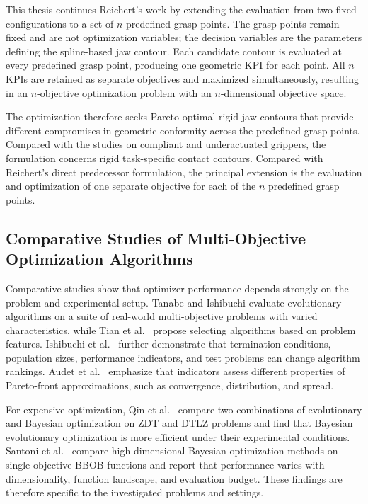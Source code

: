 This thesis continues Reichert's work by extending the evaluation from two fixed configurations to a set of \(n\) predefined grasp points. The grasp
points remain fixed and are not optimization variables; the decision variables are the parameters defining the spline-based jaw contour. Each
candidate contour is evaluated at every predefined grasp point, producing one geometric KPI for each point. All \(n\) KPIs are retained as separate
objectives and maximized simultaneously, resulting in an \(n\)-objective optimization problem with an \(n\)-dimensional objective space.

The optimization therefore seeks Pareto-optimal rigid jaw contours that provide different compromises in geometric conformity across the predefined
grasp points. Compared with the studies on compliant and underactuated grippers, the formulation concerns rigid task-specific contact contours.
Compared with Reichert's direct predecessor formulation, the principal extension is the evaluation and optimization of one separate objective for
each of the \(n\) predefined grasp points.

\subsection{Comparative Studies of Multi-Objective Optimization Algorithms}
\label{subsec:comparative_optimization_studies}

Comparative studies show that optimizer performance depends strongly on the problem and experimental setup. Tanabe and Ishibuchi \cite{Tanabe2020An}
evaluate evolutionary algorithms on a suite of real-world multi-objective problems with varied characteristics, while Tian et al.\
\cite{Tian2019Automated} propose selecting algorithms based on problem features. Ishibuchi et al.\ \cite{Ishibuchi2022Difficulties} further
demonstrate that termination conditions, population sizes, performance indicators, and test problems can change algorithm rankings. Audet et al.\
\cite{Audet2018Performance} emphasize that indicators assess different properties of Pareto-front approximations, such as convergence, distribution,
and spread.

For expensive optimization, Qin et al.\ \cite{Qin2019Bayesian} compare two combinations of evolutionary and Bayesian optimization on ZDT and DTLZ
problems and find that Bayesian evolutionary optimization is more efficient under their experimental conditions. Santoni et al.\ \cite{Santoni2023Comparison}
compare high-dimensional Bayesian optimization methods on single-objective BBOB functions and report that performance varies with dimensionality,
function landscape, and evaluation budget. These findings are therefore specific to the investigated problems and settings.

